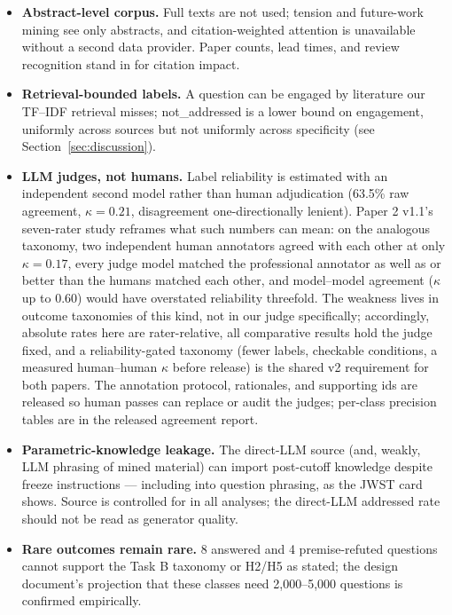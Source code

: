 \documentclass[11pt]{article}
\begin{document}
\begin{itemize}
  \item \textbf{Abstract-level corpus.} Full texts are not used; tension
    and future-work mining see only abstracts, and citation-weighted
    attention is unavailable without a second data provider. Paper
    counts, lead times, and review recognition stand in for citation
    impact.
  \item \textbf{Retrieval-bounded labels.} A question can be engaged by
    literature our TF--IDF retrieval misses; not\_addressed is a lower
    bound on engagement, uniformly across sources but not uniformly
    across specificity (see Section~\ref{sec:discussion}).
  \item \textbf{LLM judges, not humans.} Label reliability is estimated
    with an independent second model rather than human adjudication
    (63.5\% raw agreement, $\kappa=0.21$, disagreement one-directionally
    lenient). Paper 2 v1.1's seven-rater study reframes what such
    numbers can mean: on the analogous taxonomy, two independent human
    annotators agreed with each other at only $\kappa=0.17$, every
    judge model matched the professional annotator as well as or better
    than the humans matched each other, and model--model agreement
    ($\kappa$ up to 0.60) would have overstated reliability threefold.
    The weakness lives in outcome taxonomies of this kind, not in our
    judge specifically; accordingly, absolute rates here are
    rater-relative, all comparative results hold the judge fixed, and a
    reliability-gated taxonomy (fewer labels, checkable conditions, a
    measured human--human $\kappa$ before release) is the shared v2
    requirement for both papers. The annotation protocol, rationales,
    and supporting ids are released so human passes can replace or
    audit the judges; per-class precision tables are in the released
    agreement report.
  \item \textbf{Parametric-knowledge leakage.} The direct-LLM source
    (and, weakly, LLM phrasing of mined material) can import post-cutoff
    knowledge despite freeze instructions --- including into question
    phrasing, as the JWST card shows. Source is controlled for in all
    analyses; the direct-LLM addressed rate should not be read as
    generator quality.
  \item \textbf{Rare outcomes remain rare.} 8 answered and 4
    premise-refuted questions cannot support the Task B taxonomy or
    H2/H5 as stated; the design document's projection that these classes
    need 2{,}000--5{,}000 questions is confirmed empirically.

\end{itemize}
\end{document}
